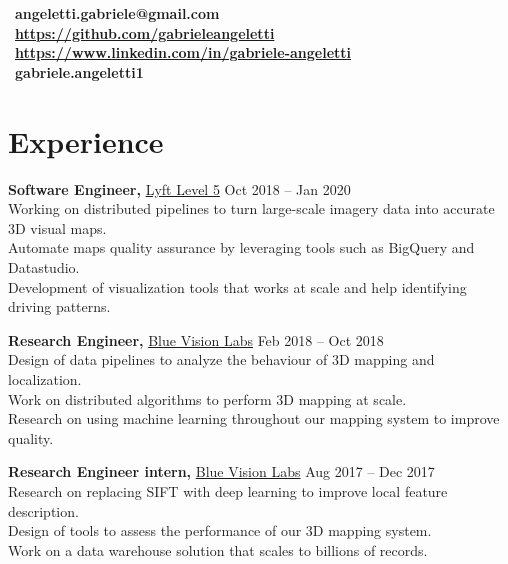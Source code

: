 \documentclass[margin]{res}
\begin{document}
    \address{London, UK  \\ (+44) 7803 056685}
    \begin{resume}
        \section{}
        \faEnvelope~\textbf{angeletti.gabriele@gmail.com} \\[5pt]
        \faGithub~\textbf{\url{https://github.com/gabrieleangeletti}} \\[5pt]
        \faLinkedin~\textbf{\url{https://www.linkedin.com/in/gabriele-angeletti}} \\[5pt]
        \faSkype~\textbf{gabriele.angeletti1}

        \section{Experience}
            {\bf Software Engineer,} \href{https://www.lyft.com/self-driving-vehicles/}{Lyft Level 5}
            \hfill Oct 2018 -- Jan 2020\\
            Working on distributed pipelines to turn large-scale imagery data into accurate 3D visual maps.\\
            Automate maps quality assurance by leveraging tools such as BigQuery and Datastudio.\\
            Development of visualization tools that works at scale and help identifying driving patterns.

            {\bf Research Engineer,} \href{http://www.bluevisionlabs.com}{Blue Vision Labs} \hfill Feb 2018 -- Oct 2018\\
            Design of data pipelines to analyze the behaviour of 3D mapping and localization.\\
            Work on distributed algorithms to perform 3D mapping at scale.\\
            Research on using machine learning throughout our mapping system to improve quality.

            {\bf Research Engineer intern,} \href{http://www.bluevisionlabs.com}{Blue Vision Labs} \hfill Aug 2017 -- Dec 2017\\
            Research on replacing SIFT with deep learning to improve local feature description.\\
	        Design of tools to assess the performance of our 3D mapping system.\\
	        Work on a data warehouse solution that scales to billions of records.


\end{resume}
\end{document}
